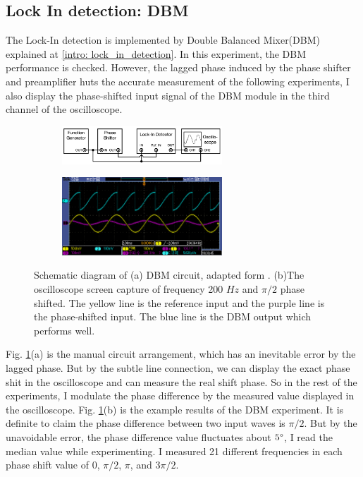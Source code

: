 \documentclass{article}
\begin{document}
 \subsection{Lock In detection: DBM}
 The Lock-In detection is implemented by Double Balanced Mixer(DBM) explained at \ref{intro: lock_in_detection}.
 In this experiment, the DBM performance is checked.
 However, the lagged phase induced by the phase shifter and preamplifier huts the accurate measurement of the following experiments,
 I also display the phase-shifted input signal of the DBM module in the third channel of the oscilloscope.
 \begin{figure}[ht]
    \centering
    \begin{subfigure}[b]{6cm}
        \centering
        \includegraphics[width=6cm]{../results/DBM_circuit.png}
        \caption{}
    \end{subfigure}
    \hfill
    \begin{subfigure}[b]{6cm}
        \centering
        \includegraphics[width=6cm]{../raw_data/TEK00396.PNG}
        \caption{}
    \end{subfigure}
    \hfill
    \caption{Schematic diagram of (a) DBM circuit, adapted form  \cite{signal_processor}.
    (b)The oscilloscope screen capture of frequency 200 $Hz$ and $\pi/2$ phase shifted.
    The yellow line is the reference input and the purple line is the phase-shifted input.
    The blue line is the DBM output which performs well.
    }
    \label{fig: DBM_circuit}
  \end{figure}
 Fig. \ref{fig: DBM_circuit}(a) is the manual circuit arrangement, which has an inevitable error by the lagged phase.
 But by the subtle line connection, we can display the exact phase shit in the oscilloscope and can measure the real shift phase.
 So in the rest of the experiments, I modulate the phase difference by the measured value displayed in the oscilloscope.
 Fig. \ref{fig: DBM_circuit}(b) is the example results of the DBM experiment.
 It is definite to claim the phase difference between two input waves is $\pi/2$.
 But by the unavoidable error, the phase difference value fluctuates about $5\degree$, I read the median value while experimenting.
 I measured 21 different frequencies in each phase shift value of 0, $\pi/2$, $\pi$, and $3\pi/2$.
\end{document}
